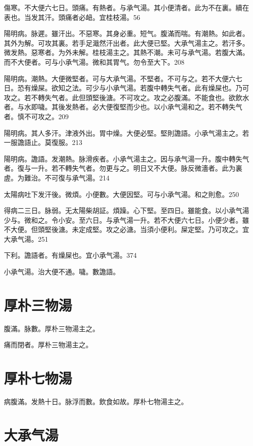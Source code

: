 傷寒。不大便六七日。頭痛。有熱者。与承气湯。其小便清者。此为不在裏。續在表也。当发其汗。頭痛者必衄。宜桂枝湯。56

陽明病。脉遲。雖汗出。不惡寒。其身必重。短气。腹滿而喘。有潮熱。如此者。其外为解。可攻其裏。若手足濈然汗出者。此大便已堅。{\khaaitp 大}承气湯主之。若汗多。微发熱。惡寒者。为外未解。{\khaaitp 桂枝湯主之。}其熱不潮。未可与承气湯。若腹大滿。而不大便者。可与小承气湯。微和其胃气。勿令至大下。208

陽明病。潮熱。大便微堅者。可与{\khaaitp 大}承气湯。不堅者。不可与之。若不大便六七日。恐有燥屎。欲知之法。可少与小承气湯。若腹中轉失气者。此有燥屎也。乃可攻之。若不轉失气者。此但頭堅後溏。不可攻之。攻之必腹滿。不能食也。欲飲水者。与水即噦。其後发熱者。必大便復堅而少也。以小承气湯和之。若不轉失气者。慎不可攻之。209

陽明病。其人多汗。津液外出。胃中燥。大便必堅。堅則譫語。{\khaaitp 小}承气湯主之。{\khaaitp 若一服譫語止。莫復服。}213

陽明病。譫語。发潮熱。脉滑疾者。{\khaaitp 小}承气湯主之。因与承气湯一升。腹中轉失气者。復与一升。若不轉失气者。勿更与之。明日又不大便。脉反微濇者。此为裏虗。为難治。不可復与承气湯。214

太陽病吐下发汗後。微煩。小便數。大便因堅。可与小承气湯。和之則愈。250

得病二三日。脉弱。无太陽柴胡証。煩躁。心下堅。至四日。雖能食。以{\khaaitp 小}承气湯少与。微和之。令小安。至六日。与承气湯一升。若不大便六七日。小便少者。雖不大便。但頭堅後溏。未定成堅。攻之必溏。当須小便利。屎定堅。乃可攻之。宜{\khaaitp 大}承气湯。251

下利。譫語者。有燥屎也。宜{\khaaitp 小}承气湯。374

小承气湯。治大便不通。噦。數譫語。

\section{厚朴三物湯}

腹滿。脉數。厚朴三物湯主之。{\wuben}

痛而閉者。厚朴三物湯主之。{\dengben}

\section{厚朴七物湯}

病腹滿。发熱十日。脉浮而數。飲食如故。厚朴七物湯主之。

\section{大承气湯}


